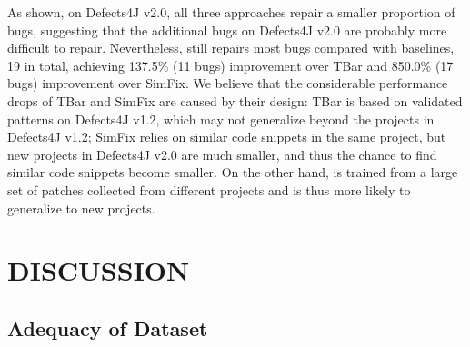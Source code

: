  As shown, on Defects4J v2.0, all three approaches repair a smaller proportion of bugs, suggesting that the additional bugs on Defects4J v2.0 are probably more difficult to repair. Nevertheless, \techname still repairs most bugs compared with baselines, 19 in total, achieving 137.5\% (11 bugs) improvement over TBar and 850.0\% (17 bugs) improvement over SimFix. We believe that the considerable performance drops of TBar and SimFix are caused by their design: TBar is based on validated patterns on Defects4J v1.2, which may not generalize beyond the projects in Defects4J v1.2; SimFix relies on similar code snippets in the same project, but new projects in Defects4J v2.0 are much smaller, and thus the chance to find similar code snippets become smaller. On the other hand, \techname is trained from a large set of patches collected from different projects and is thus more likely to generalize to new projects. 
\begin{table}
\caption{Comparison on IntroClassJava and QuixBugs}\vspace{-2mm}
\label{tab:rede3}
\end{table}
\section{DISCUSSION}
\subsection{Adequacy of Dataset}

